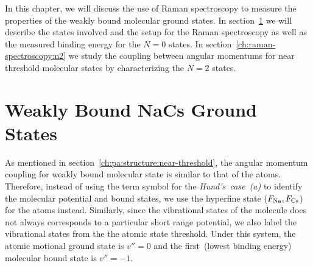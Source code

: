 In this chapter, we will discuss the use of Raman spectroscopy
to measure the properties of the weakly bound molecular ground states.
In section~\ref{ch:raman-spectroscopy:states}
we will describe the states involved and the setup for the Raman spectroscopy
as well as the measured binding energy for the $N=0$ states.
In section~\ref{ch:raman-spectroscopy:n2}
we study the coupling between angular momentums for near threshold molecular states
by characterizing the $N=2$ states.

\section{Weakly Bound NaCs Ground States}
\label{ch:raman-spectroscopy:states}

As mentioned in section~\ref{ch:pa:structure:near-threshold},
the angular momentum coupling for weakly bound molecular state is similar to that of the atoms.
Therefore, instead of using the term symbol for the \textit{Hund's~case~(a)}
to identify the molecular potential and bound states,
we use the hyperfine state ($F_{\mathrm{Na}}, F_{\mathrm{Cs}}$) for the atoms instead.
Similarly, since the vibrational states of the molecule does not always corresponds to
a particular short range potential, we also label the vibrational states
from the the atomic state threshold.
Under this system, the atomic motional ground state is $v''=0$ and
the first~(lowest binding energy) molecular bound state is $v''=-1$.

